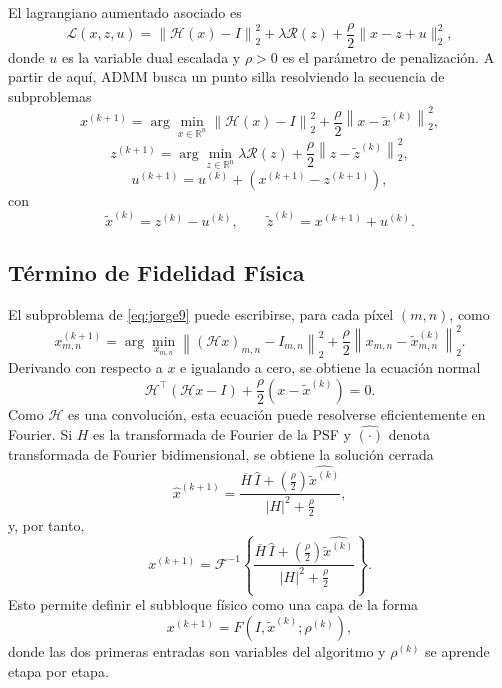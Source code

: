\documentclass[conference]{IEEEtran}
\begin{document}
El lagrangiano aumentado asociado es
\begin{equation}
\mathcal{L}(x,z,u)
=
\left\|
\mathcal{H}(x)-I
\right\|_2^2
+
\lambda \mathcal{R}(z)
+
\frac{\rho}{2}\|x-z+u\|_2^2,
\label{eq:jorge8}
\end{equation}
donde $u$ es la variable dual escalada y $\rho>0$ es el parámetro de penalización. A partir de aquí, ADMM busca un punto silla resolviendo la secuencia de subproblemas
\begin{equation}
x^{(k+1)}
=
\arg\min_{x\in\mathbb{R}^n}
\left\|
\mathcal{H}(x)-I
\right\|_2^2
+
\frac{\rho}{2}
\left\|
x-\tilde{x}^{(k)}
\right\|_2^2,
\label{eq:jorge9}
\end{equation}
\begin{equation}
z^{(k+1)}
=
\arg\min_{z\in\mathbb{R}^n}
\lambda \mathcal{R}(z)
+
\frac{\rho}{2}
\left\|
z-\tilde{z}^{(k)}
\right\|_2^2,
\label{eq:jorge10}
\end{equation}
\begin{equation}
u^{(k+1)}
=
u^{(k)}+\left(x^{(k+1)}-z^{(k+1)}\right),
\label{eq:jorge11}
\end{equation}
con
\[
\tilde{x}^{(k)}=z^{(k)}-u^{(k)},
\qquad
\tilde{z}^{(k)}=x^{(k+1)}+u^{(k)}.
\]

\subsection{Término de Fidelidad Física}
El subproblema de \eqref{eq:jorge9} puede escribirse, para cada píxel $(m,n)$, como
\begin{equation}
x_{m,n}^{(k+1)}
=
\arg\min_{x_{m,n}}
\left\|
(\mathcal{H}x)_{m,n}-I_{m,n}
\right\|_2^2
+
\frac{\rho}{2}
\left\|
x_{m,n}-\tilde{x}_{m,n}^{(k)}
\right\|_2^2.
\label{eq:jorge12}
\end{equation}
Derivando con respecto a $x$ e igualando a cero, se obtiene la ecuación normal
\begin{equation}
\mathcal{H}^{\top}\!\left(\mathcal{H}x-I\right)
+
\frac{\rho}{2}
\left(x-\tilde{x}^{(k)}\right)
=0.
\label{eq:jorge13}
\end{equation}
Como $\mathcal{H}$ es una convolución, esta ecuación puede resolverse eficientemente en Fourier. Si $H$ es la transformada de Fourier de la PSF y $\widehat{(\cdot)}$ denota transformada de Fourier bidimensional, se obtiene la solución cerrada
\begin{equation}
\widehat{x}^{(k+1)}
=
\frac{
\overline{H}\,\widehat{I}
+
\left(\frac{\rho}{2}\right)\widehat{\tilde{x}^{(k)}}
}{
|H|^2+\frac{\rho}{2}
},
\label{eq:jorge14}
\end{equation}
y, por tanto,
\begin{equation}
x^{(k+1)}
=
\mathcal{F}^{-1}
\left\{
\frac{
\overline{H}\,\widehat{I}
+
\left(\frac{\rho}{2}\right)\widehat{\tilde{x}^{(k)}}
}{
|H|^2+\frac{\rho}{2}
}
\right\}.
\label{eq:jorge15}
\end{equation}
Esto permite definir el subbloque físico como una capa de la forma
\begin{equation}
x^{(k+1)}
=
F\!\left(I,\tilde{x}^{(k)};\rho^{(k)}\right),
\label{eq:jorge16}
\end{equation}
donde las dos primeras entradas son variables del algoritmo y $\rho^{(k)}$ se aprende etapa por etapa.
\end{document}
